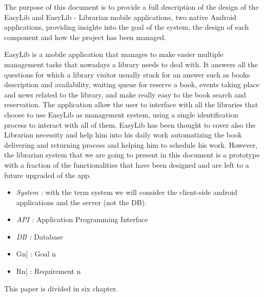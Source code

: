 \vspace*{-5mm}

The purpose of this document is to provide a full description of the design of the
EasyLib and EasyLib - Librarian mobile applications, two native Android applications, providing insights into the goal of the system, the design of each component and how the project has been managed.

EasyLib is a mobile application that manages to make easier multiple management tasks that nowadays a library needs to deal with. It answers all the questions for which a library visitor usually stuck for an answer such as books description and availability, waiting queue for reserve a book, events taking place and news related to the library, and make really easy to the book search and reservation. The application allow the user to interface with all the libraries that choose to use EasyLib as management system, using a single identification process to interact with all of them.
EasyLib has been thought to cover also the Librarian necessity and help him into his daily work automatizing the book delivering and returning process and helping him to schedule his work. However, the librarian system that we are going to present in this document is a prototype with a fraction of the functionalities that have been designed and are left to a future upgraded of the app.


\begin{itemize}
	\item \emph{System :} with the term system we will consider the client-side android applications and the server (not the DB).
\end{itemize}

\begin{itemize}
	\setlength{\leftskip}{0.5cm}
	\item \emph{API :} Application Programming Interface
	\item \emph{DB :} Database
\end{itemize}

\begin{itemize}
	\setlength{\leftskip}{0.5cm}
	\item \lbrack Gn] : Goal n
	\item \lbrack Rn] : Requirement n
\end{itemize}

This paper is divided in six chapter.\\

